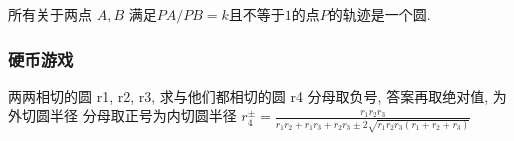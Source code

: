 所有关于两点 $A,B$ 满足$PA/PB=k$且不等于$1$的点$P$的轨迹是一个圆.
\subsubsection*{硬币游戏}
两两相切的圆 r1, r2, r3, 求与他们都相切的圆 r4
分母取负号, 答案再取绝对值, 为外切圆半径
分母取正号为内切圆半径
$ r^{\pm}_4 = \frac{r_1 r_2 r_3}{r_1 r_2 + r_1 r_3 + r_2 r_3 \pm 2\sqrt{r_1r_2r_3(r_1 + r_2 + r_3)}} $
